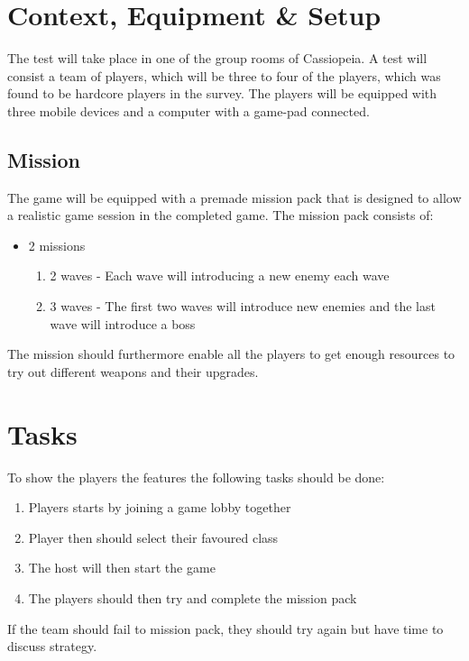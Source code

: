 \section{Context, Equipment & Setup}
The test will take place in one of the group rooms of Cassiopeia.
A test will consist a team of players, which will be three to four of the players, which was found to be hardcore players in the survey.
The players will be equipped with three mobile devices and a computer with a game-pad connected.

\subsection{Mission}
The game will be equipped with a premade mission pack that is designed to allow a realistic game session in the completed game.
The mission pack consists of:
\begin{itemize}
	\item 2 missions
	\begin{enumerate}
		\item 2 waves - Each wave will introducing a new enemy each wave
		\item 3 waves - The first two waves will introduce new enemies and the last wave will introduce a boss
	\end{enumerate}
\end{itemize}
The mission should furthermore enable all the players to get enough resources to try out different weapons and their upgrades.

\section{Tasks}
To show the players the features the following tasks should be done:
\begin{enumerate}
\item Players starts by joining a game lobby together
\item Player then should select their favoured class
\item The host will then start the game
\item The players should then try and complete the mission pack
\end{enumerate}
If the team should fail to mission pack, they should try again but have time to discuss strategy.

